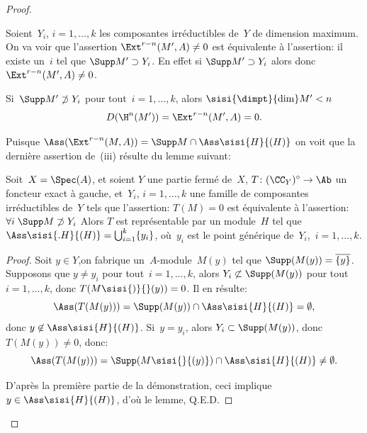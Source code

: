 \begin{proof}
\begin{enumeratei}
Soient~$Y_{i}$, $i=1,\dots, k$ les composantes irr\'eductibles de~$Y$ de dimension maximum. On va voir que l'assertion $\Ext^{r-n}(M^{\prime}, A)\neq 0$ est \'equivalente \`a l'assertion: il existe un~$i$ tel que $\Supp M^{\prime}\supset Y_{i}$. En effet si $\Supp M^{\prime}\supset Y_{i}$ alors  donc $\Ext^{r-n}(M^{\prime}, A)\neq 0$.

Si~$\Supp M^{\prime}\not\supset Y_{i}$ pour tout~$i=1,\dots, k$, alors $\sisi{\dimpt}{\dim} M^{\prime}<n$
$$D(\H^{n}(M^{\prime}))=\Ext^{r-n}(M^{\prime}, A)=0.
$$

Puisque $\Ass(\Ext^{r-n}(M, A))=\Supp M\cap\Ass \sisi{H}{(H)}$ on voit que la derni\`ere assertion de~(iii) r\'esulte du lemme suivant:
\end{enumeratei}

\begin{lemme} \label{V.3.3} Soit~$X=\Spec(A)$, et soient $Y$ une partie ferm\'e de~$X$, $T\colon (\CC_{Y})^{\circ}\to\Ab$ un foncteur exact \`a gauche, et~$Y_{i}$, $i=1,\dots, k$ une famille de composantes irr\'eductibles de~$Y$ tels que l'assertion: $T(M)=0$ est \'equivalente \`a l'assertion: $\forall i\;\Supp M\not\supset Y_{i}$ Alors $T$ est repr\'esentable par un module~$H$ tel que $\Ass\sisi{.H}{(H)}=\bigcup_{i=1}^{k}\{y_{i}\}$, o\`u~$y_{i}$ est le point g\'en\'erique de~$Y_{i}$,~$i=1,\dots, k$.
\end{lemme}

\begin{proof}
Soit $y\in Y$,\pageoriginaled on fabrique un~$A$-module~$M(y)$ tel que $\Supp(M(y))=\overline{\{ y\} }$. Supposons que $y\neq y_{i}$ pour tout~$i=1,\dots, k$, alors $Y_{i}\not\subset\Supp(M(y))$ pour tout~$i=1,\dots, k$, donc $T(M\sisi{)}{}(y))=0$. Il en r\'esulte:
$$
\Ass(T(M(y)))=\Supp(M(y))\cap\Ass \sisi{H}{(H)}=\emptyset,
$$
donc $y\not\in\Ass \sisi{H}{(H)}$. Si~$y=y_{i}$, alors $Y_{i}\subset\Supp(M(y))$, donc $T(M(y))\neq 0$, donc:
$$
\Ass(T(M(y)))=\Supp(M\sisi{}{(y)})\cap\Ass \sisi{H}{(H)}\neq\emptyset.
$$

D'apr\`es la premi\`ere partie de la d\'emonstration, ceci implique~$y\in\Ass \sisi{H}{(H)}$, d'o\`u le lemme, \hfill Q.E.D.
\skipqed
\end{proof}
\skipqed
\end{proof}

